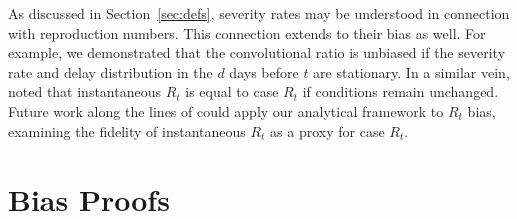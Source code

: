 \documentclass{article}
\renewcommand{\hat}{\widehat} %
\begin{document}
As discussed in Section~\ref{sec:defs}, severity rates may be understood in connection with reproduction numbers. This connection extends to their bias as well. For example, we  demonstrated that the convolutional ratio is unbiased if the severity rate and delay distribution in the $d$ days before $t$ are stationary. In a similar vein, \citet{fraser2007} noted that instantaneous $R_t$ is equal to case $R_t$ if conditions remain unchanged. 
Future work along the lines of \citet{rt_study} could apply our analytical framework to $R_t$ bias, examining the fidelity of instantaneous $R_t$ as a proxy for case $R_t$. 




\pagebreak
\appendix
\section{Bias Proofs}\label{apx:proofs}
\end{document}
